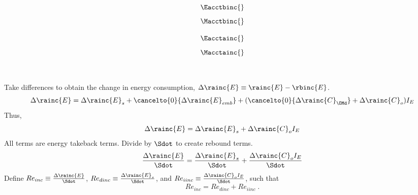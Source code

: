 

\begin{landscape}

\linespread{1}


\sectionsep{}

{
\begin{equation}
\Eacctbinc{}
\end{equation}
}
{
\begin{equation}
\Macctbinc{}
\end{equation}
}

\sectionsep{}

{
\begin{equation}
\Eacctainc{}
\end{equation}
}
{
\begin{equation}
\Macctainc{}
\end{equation}
}

\sectionsep{}

\derivsection{}
{
~

Take differences to obtain the change in energy consumption, $\Delta \rainc{E} \equiv \rainc{E} - \rbinc{E}$.
%
\begin{equation}
  \Delta \rainc{E} = \Delta \rainc{E}_s 
                     + \cancelto{0}{\Delta \rainc{E}_{emb}}
                     + (\cancelto{0}{\Delta \rainc{C}_{\OMd}} + \Delta \rainc{C}_o) I_E
\end{equation}
%
Thus, 
%
\begin{equation}
  \Delta \rainc{E} = \Delta \rainc{E}_s + \Delta \rainc{C}_o I_E
\end{equation}
%
All terms are energy takeback terms.
Divide by $\Sdot$
to create rebound terms.
%
\begin{equation}
  \frac{\Delta \rainc{E}}{\Sdot} = \frac{\Delta \rainc{E}_s}{\Sdot} + \frac{\Delta \rainc{C}_o I_E}{\Sdot}
\end{equation}
%
Define 
$Re_{inc} \equiv \frac{\Delta \rainc{E}}{\Sdot}$, 
$Re_{dinc} \equiv \frac{\Delta \rainc{E}_s}{\Sdot}$, and 
$Re_{iinc} \equiv \frac{\Delta \rainc{C}_o I_E}{\Sdot}$,
such that
%
\begin{equation} \label{eq:Re_inc_def}
  Re_{inc} = Re_{dinc} + Re_{iinc} \; .
\end{equation}
%
}
{
~

}
\end{landscape}
